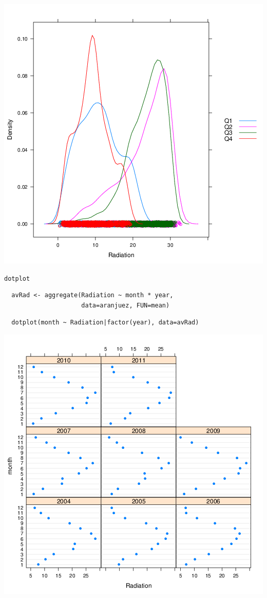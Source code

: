 \documentclass[xcolor={usenames,svgnames,dvipsnames}]{beamer}
\begin{document}
\begin{frame}[label=sec-3-47]{}
\includegraphics[width=.9\linewidth]{figs/density.png}
\end{frame}

\begin{frame}[fragile,label=sec-3-48]{\texttt{dotplot}}
 \lstset{language=R,label= ,caption= ,numbers=none}
\begin{lstlisting}
  avRad <- aggregate(Radiation ~ month * year,
                     data=aranjuez, FUN=mean)
\end{lstlisting}

\lstset{language=R,label= ,caption= ,numbers=none}
\begin{lstlisting}
  dotplot(month ~ Radiation|factor(year), data=avRad)
\end{lstlisting}
\end{frame}

\begin{frame}[label=sec-3-49]{}
\includegraphics[width=.9\linewidth]{figs/dotplot.png}
\end{frame}
\end{document}
